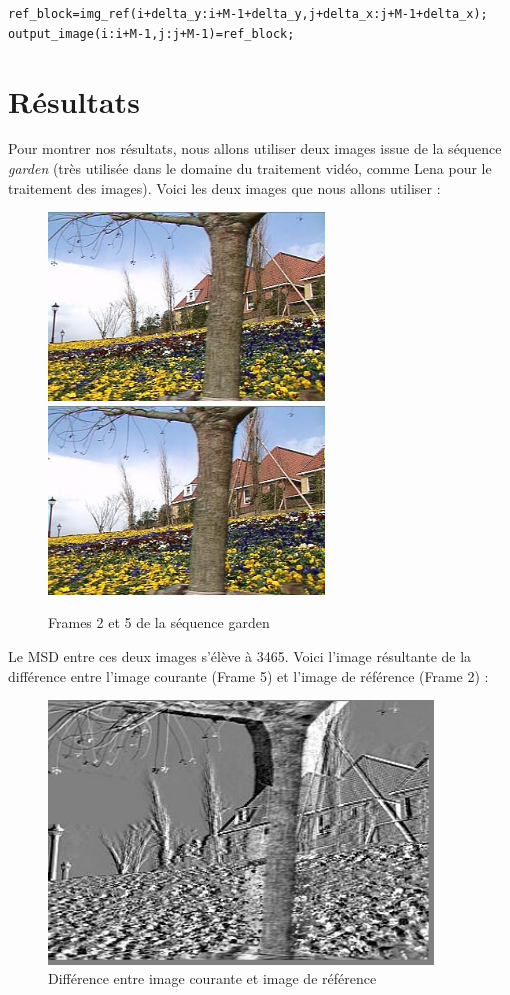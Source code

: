 \documentclass[a4paper, 12pt]{article}
\begin{document}
\begin{alltt} 
ref_block = img_ref(i+delta_y : i+M-1+delta_y ,j+delta_x : j+M-1+delta_x);
output_image(i : i+M-1 ,j : j+M-1) = ref_block;
\end{alltt}

\newpage
\section{Résultats}

Pour montrer nos résultats, nous allons utiliser deux images issue de la séquence \textit{garden} (très utilisée dans le domaine du traitement vidéo, comme Lena pour le traitement des images). Voici les deux images que nous allons utiliser : 

\begin{figure}[H]
	\centering
	\includegraphics[height=5cm]{../garden1.jpg}
	\includegraphics[height=5cm]{../garden2.jpg}
	\caption{Frames 2 et 5 de la séquence garden}
	\label{fig:garden}
\end{figure}

Le MSD entre ces deux images s'élève à 3465. Voici l'image résultante de la différence entre l'image courante (Frame 5) et l'image de référence (Frame 2) :

\begin{figure}[H]
	\centering
	\includegraphics[height=7cm]{../Resultats/Garden/garden_error.jpg}
	\caption{Différence entre image courante et image de référence}
	\label{fig:garden_error}
\end{figure}
\end{document}
